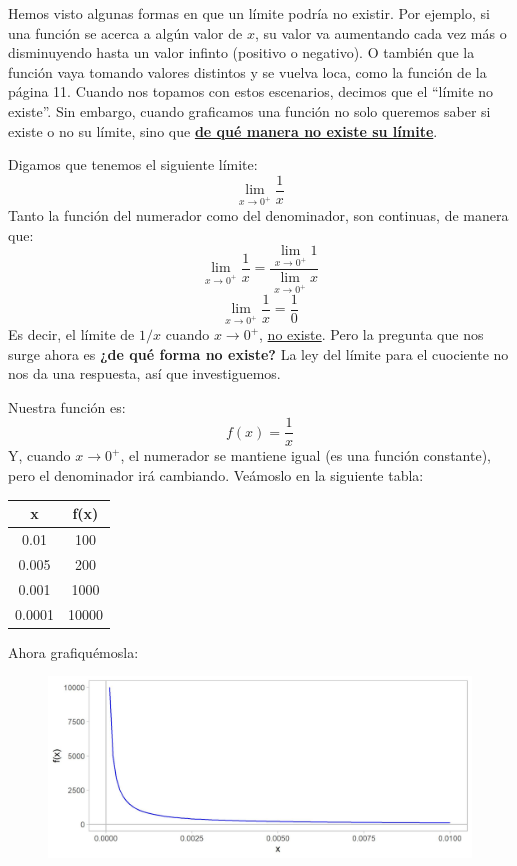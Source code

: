 \documentclass[12pt]{article}
\begin{document}
Hemos visto algunas formas en que un límite podría no existir. Por ejemplo, si una función se acerca a algún valor de $x$, su valor va aumentando cada vez más o disminuyendo hasta un valor infinto (positivo o negativo). O también que la función vaya tomando valores distintos y se vuelva loca, como la función de la página 11. Cuando nos topamos con estos escenarios, decimos que el ``límite no existe''. Sin embargo, cuando graficamos una función no solo queremos saber si existe o no su límite, sino que \textbf{\underline{de qué manera no existe su límite}}.

Digamos que tenemos el siguiente límite:
\[\lim_{x \to 0^{+}} \frac{1}{x}\]
Tanto la función del numerador como del denominador, son continuas, de manera que:
\[\lim_{x \to 0^{+}} \frac{1}{x} = \frac{\lim_{x \to 0^{+}} 1}{\lim_{x \to 0^{+}} x}\]
\[\lim_{x \to 0^{+}} \frac{1}{x} = \frac{1}{0}\]
Es decir, el límite de $1/x$ cuando $x \to 0^{+}$, \underline{no existe}. Pero la pregunta que nos surge ahora es \textbf{¿de qué forma no existe?} La ley del límite para el cuociente no nos da una respuesta, así que investiguemos.

Nuestra función es:
\[f(x) = \frac{1}{x}\]
Y, cuando $x \to 0^{+}$, el numerador se mantiene igual (es una función constante), pero el denominador irá cambiando. Veámoslo en la siguiente tabla:

\newpage

\begin{table}[hbt!]
\centering

\begin{tabular}{c | c}
x & f(x)\\
\hline
0.01 & 100\\
0.005 & 200\\
0.001 & 1000\\
0.0001 & 10000\\
\end{tabular}

\end{table}

Ahora grafiquémosla:

\begin{figure}[hbt!]
\centering
\includegraphics[scale=0.7]{img/infinite_limit_plot.jpg}
\end{figure}
\end{document}
